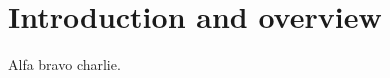 \documentclass{amsart}
\begin{document}
\section{Introduction and overview}
Alfa bravo charlie.
\end{document}

